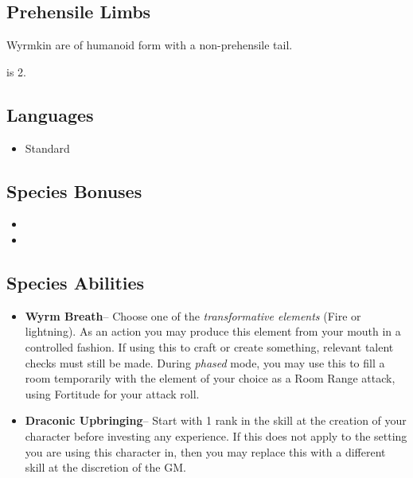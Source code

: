 {\subsection*{Prehensile Limbs}

Wyrmkin are of humanoid form with a non-prehensile tail.

 is 2.

\subsection*{Languages}

\begin{itemize}
	\item Standard
\end{itemize}

\subsection*{Species Bonuses}

\begin{itemize}
	\item {}
	\item {}
\end{itemize}

\subsection*{Species Abilities}

\begin{itemize}
	\item \textbf{Wyrm Breath}-- Choose one of the \emph{transformative elements} (Fire or lightning). As an action you may produce this element from your mouth in a controlled fashion. If using this to craft or create something, relevant talent checks must still be made. During \emph{phased} mode, you may use this to fill a room temporarily with the element of your choice as a Room Range attack, using Fortitude for your attack roll.
	\item \textbf{Draconic Upbringing}-- Start with 1 rank in the skill  at the creation of your character before investing any experience. If this does not apply to the setting you are using this character in, then you may replace this with a different  skill at the discretion of the GM.
\end{itemize}

}
